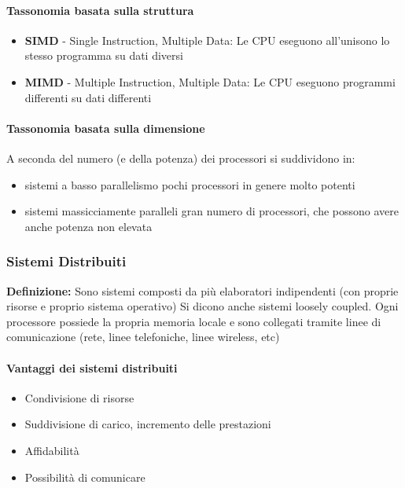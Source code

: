 \paragraph{Tassonomia basata sulla struttura}
 \begin{itemize}
\item \textbf{SIMD} - Single Instruction, Multiple Data: Le CPU              eseguono all'unisono lo stesso programma su dati diversi
\item \textbf{MIMD} - Multiple Instruction, Multiple Data: Le CPU            eseguono programmi differenti su dati differenti
\end{itemize}

\paragraph{Tassonomia basata sulla dimensione}

A seconda del numero (e della potenza) dei processori si suddividono in:
\begin{itemize}
\item sistemi a basso parallelismo
pochi processori in genere molto potenti
\item sistemi massicciamente paralleli
gran numero di processori, che possono avere anche potenza non elevata
\end{itemize}

\subsubsection{Sistemi Distribuiti}
\textbf{Definizione:} Sono sistemi composti da più elaboratori indipendenti (con proprie risorse e
proprio sistema operativo)
Si dicono anche sistemi loosely coupled.
Ogni processore possiede la propria memoria locale e sono collegati tramite linee di comunicazione (rete, linee
telefoniche, linee wireless, etc)

\paragraph{Vantaggi dei sistemi distribuiti}
    \begin{itemize}
    \item Condivisione di risorse
    \item Suddivisione di carico, incremento delle prestazioni
    \item Affidabilità
    \item Possibilità di comunicare
\end{itemize}

